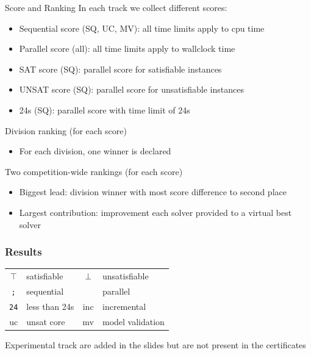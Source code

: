 \documentclass[table]{beamer}
\def\emph#1{\textcolor{MYblue}{#1}}
\begin{document}
\begin{frame}{Score and Ranking}
  In each track we collect different scores:
  \begin{itemize}
  \item \emph{Sequential score} (SQ, UC, MV): all time limits apply to cpu time
  \item \emph{Parallel score} (all): all time limits apply to wallclock time
  \item \emph{SAT score} (SQ): parallel score for \emph{satisfiable} instances
  \item \emph{UNSAT score} (SQ): parallel score for \emph{unsatisfiable} instances
  \item \emph{24s} (SQ): parallel score with time limit of \emph{24s}
  \end{itemize}
  \bigskip

  Division ranking (for each score)
  \begin{itemize}
  \item For each division, one winner is declared
  \end{itemize}

  \bigskip

  Two competition-wide rankings (for each score)
  \begin{itemize}
  \item \emph{Biggest lead}: division winner with most score difference to second place
  \item \emph{Largest contribution}: improvement each solver provided to a virtual best solver
  \end{itemize}

\end{frame}

\newcommand{\seq}{\texttt{;}}
\newcommand{\paral}{\textbardbl}
\newcommand{\sat}{$\top$}
\newcommand{\unsat}{$\bot$}
\newcommand{\fast}{\texttt{24}}
\newcommand{\inc}{inc}
\newcommand{\uc}{uc}
\newcommand{\mv}{mv}
\newcommand{\cloud}{cloud}
\newcommand{\paralTrack}{parallel}

\begin{frame}
  \frametitle{Results}
  \begin{center}
    \begin{tabular}{|cl|cl|}
  \hline
  \sat & satisfiable & \unsat & unsatisfiable \\
  \seq & sequential & \paral & parallel \\
  \fast & less than 24s & \inc & incremental \\
  \uc & unsat core & \mv & model validation \\
  \hline
\end{tabular}
\end{center}
\vfill
Experimental track are added in the slides but are not present
in the certificates
\end{frame}
\end{document}
